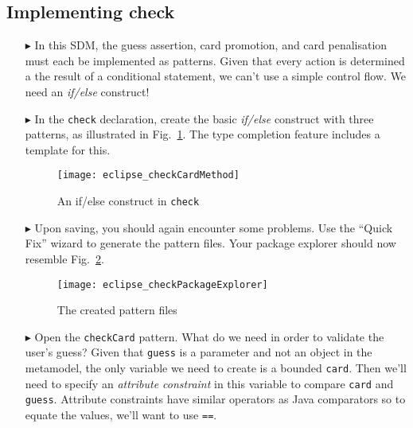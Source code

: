 \newpage
\hypertarget{checkCard tex}{}
\subsection{Implementing check}
\texHeader
 
\begin{itemize}
   
\item[$\blacktriangleright$] In this SDM, the guess assertion, card promotion, and card penalisation must each be implemented as patterns. Given that every
action is determined a the result of a conditional statement, we can't use a simple control flow. We need an \emph{if/else} construct!

\item[$\blacktriangleright$] In the \texttt{check} declaration, create the basic \emph{if/else} construct with three patterns, as illustrated in
Fig.~\ref{fig:checkDec}. The type completion feature includes a template for this.

\vspace{0.5cm}

\begin{figure}[htbp]
\begin{center}
  \texttt{[image: eclipse\_checkCardMethod]}
  \caption{An if/else construct in \texttt{check}}
  \label{fig:checkDec}
\end{center}
\end{figure} 

\item[$\blacktriangleright$] Upon saving, you should again encounter some problems. Use the ``Quick Fix'' wizard to generate the pattern files. Your package
explorer should now resemble Fig.~\ref{fig:checkPatternsExplorer}.

\begin{figure}[htbp]
\begin{center}
  \texttt{[image: eclipse\_checkPackageExplorer]}
  \caption{The created pattern files}
  \label{fig:checkPatternsExplorer}
\end{center}
\end{figure} 

\item[$\blacktriangleright$] Open the \texttt{checkCard} pattern. What do we need in order to validate the user's guess? Given that \texttt{guess} is a
parameter and not an object in the metamodel, the only variable we need to create is a bounded \texttt{card}. Then we'll need to specify an \emph{attribute constraint} in this variable to compare
\texttt{card} and \texttt{guess}. Attribute constraints have similar operators as Java comparators so to equate the values, we'll want to use \texttt{==}.


\end{itemize}
